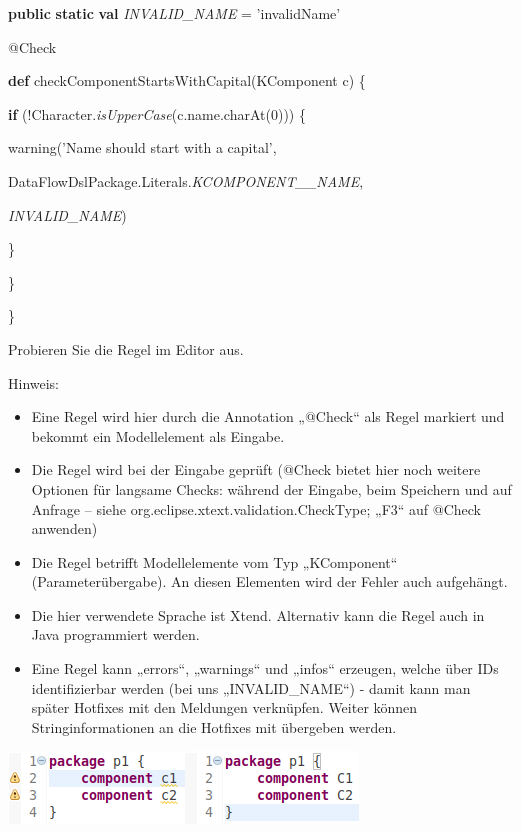 \documentclass[]{article}
\providecommand{\tightlist}{%
  \setlength{\itemsep}{0pt}\setlength{\parskip}{0pt}}
\begin{document}
\textbf{public} \textbf{static} \textbf{val} \emph{INVALID\_NAME} =
'invalidName'

@Check

\textbf{def} checkComponentStartsWithCapital(KComponent c) \{

\textbf{if} (!Character.\emph{isUpperCase}(c.name.charAt(0))) \{

warning('Name should start with a capital',

DataFlowDslPackage.Literals.\emph{KCOMPONENT\_\_NAME},

\emph{INVALID\_NAME})

\}

\}

\}

Probieren Sie die Regel im Editor aus.

Hinweis:

\begin{itemize}
\tightlist
\item
  Eine Regel wird hier durch die Annotation „@Check`` als Regel markiert
  und bekommt ein Modellelement als Eingabe.
\item
  Die Regel wird bei der Eingabe geprüft (@Check bietet hier noch
  weitere Optionen für langsame Checks: während der Eingabe, beim
  Speichern und auf Anfrage -- siehe
  org.eclipse.xtext.validation.CheckType; „F3`` auf @Check anwenden)
\item
  Die Regel betrifft Modellelemente vom Typ „KComponent``
  (Parameterübergabe). An diesen Elementen wird der Fehler auch
  aufgehängt.
\item
  Die hier verwendete Sprache ist Xtend. Alternativ kann die Regel auch
  in Java programmiert werden.
\item
  Eine Regel kann „errors``, „warnings`` und „infos`` erzeugen, welche
  über IDs identifizierbar werden (bei uns „INVALID\_NAME``) - damit
  kann man später Hotfixes mit den Meldungen verknüpfen. Weiter können
  Stringinformationen an die Hotfixes mit übergeben werden.
\end{itemize}

\includegraphics[width=1.84370in,height=0.75000in]{./Pictures/10000201000000B1000000483B963938C77E8851.png}\includegraphics[width=1.81260in,height=0.76020in]{./Pictures/10000201000000AE00000049360C389AF76C863A.png}
\end{document}
